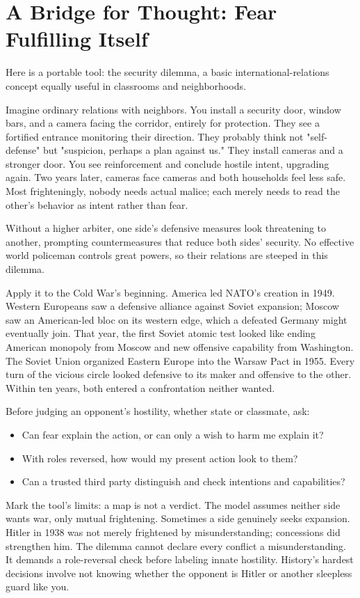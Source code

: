 \section{A Bridge for Thought: Fear Fulfilling Itself}
Here is a portable tool: the security dilemma, a basic international-relations concept equally useful in classrooms and neighborhoods.

Imagine ordinary relations with neighbors. You install a security door, window bars, and a camera facing the corridor, entirely for protection. They see a fortified entrance monitoring their direction. They probably think not "self-defense" but "suspicion, perhaps a plan against us." They install cameras and a stronger door. You see reinforcement and conclude hostile intent, upgrading again. Two years later, cameras face cameras and both households feel less safe. Most frighteningly, nobody needs actual malice; each merely needs to read the other's behavior as intent rather than fear.

Without a higher arbiter, one side's defensive measures look threatening to another, prompting countermeasures that reduce both sides' security. No effective world policeman controls great powers, so their relations are steeped in this dilemma.

Apply it to the Cold War's beginning. America led NATO's creation in 1949. Western Europeans saw a defensive alliance against Soviet expansion; Moscow saw an American-led bloc on its western edge, which a defeated Germany might eventually join. That year, the first Soviet atomic test looked like ending American monopoly from Moscow and new offensive capability from Washington. The Soviet Union organized Eastern Europe into the Warsaw Pact in 1955. Every turn of the vicious circle looked defensive to its maker and offensive to the other. Within ten years, both entered a confrontation neither wanted.

Before judging an opponent's hostility, whether state or classmate, ask:

\begin{itemize}
\item Can fear explain the action, or can only a wish to harm me explain it?
\item With roles reversed, how would my present action look to them?
\item Can a trusted third party distinguish and check intentions and capabilities?
\end{itemize}
Mark the tool's limits: a map is not a verdict. The model assumes neither side wants war, only mutual frightening. Sometimes a side genuinely seeks expansion. Hitler in 1938 was not merely frightened by misunderstanding; concessions did strengthen him. The dilemma cannot declare every conflict a misunderstanding. It demands a role-reversal check before labeling innate hostility. History's hardest decisions involve not knowing whether the opponent is Hitler or another sleepless guard like you.

